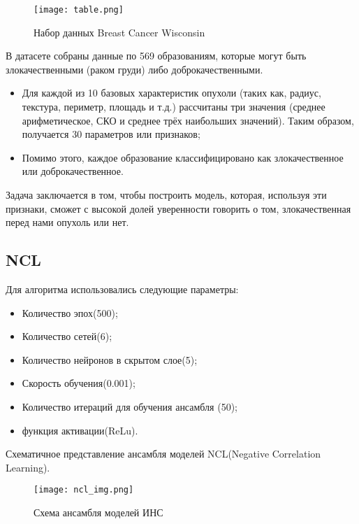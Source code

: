 \documentclass[12pt]{extarticle}
\begin{document}
\begin{figure}[H]
    \centering
    \texttt{[image: table.png]} %
    \caption{Набор данных Breast Cancer Wisconsin}
    \label{fig:example}
\end{figure}

\FloatBarrier %

В датасете собраны данные по 569 образованиям, которые могут быть злокачественными (раком груди) либо доброкачественными.
\begin{itemize}
    \item Для каждой из 10 базовых характеристик опухоли (таких как, радиус, текстура, периметр, площадь и т.д.) рассчитаны три значения (среднее арифметическое, СКО и среднее трёх наибольших значений). Таким образом, получается 30 параметров или признаков;
    \item Помимо этого, каждое образование классифицировано как злокачественное или доброкачественное.
\end{itemize}

Задача заключается в том, чтобы построить модель, которая, используя эти признаки, сможет с высокой долей уверенности говорить о том, злокачественная перед нами опухоль или нет.

\newpage %

\subsection{NCL}
Для алгоритма использовались следующие параметры:

\begin{itemize}
    \item Количество эпох(500);
    \item Количество сетей(6);
    \item Количество нейронов в скрытом слое(5);
    \item Скорость обучения(0.001);
    \item Количество итераций для обучения ансамбля (50);
    \item функция активации(ReLu).
\end{itemize}

Схематичное представление ансамбля моделей NCL(Negative Correlation Learning).

\begin{figure}[H]
    \centering
    \texttt{[image: ncl\_img.png]} %
    \caption{Схема ансамбля моделей ИНС}
    \label{fig:example}
\end{figure}
\end{document}
